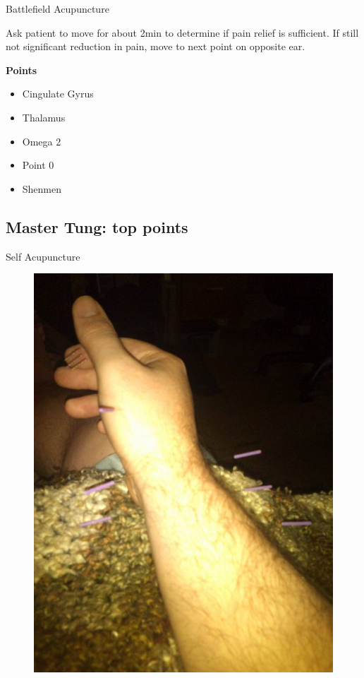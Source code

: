 \begin{frame}{Battlefield Acupuncture}

Ask patient to move for about 2min to determine if pain relief is sufficient. If still not significant reduction in pain, move to next point on opposite ear. 

\textbf{\large Points}

\begin{itemize}
\item Cingulate Gyrus
\item Thalamus
\item Omega 2
\item Point 0
\item Shenmen
\end{itemize}

\end{frame}

\subsection{Master Tung: top points}

\begin{frame}{Self Acupuncture}
  \begin{figure}
    \centering
    \includegraphics[height=0.65\textheight]{img/acuhand.jpg}
  \end{figure}

\end{frame}

